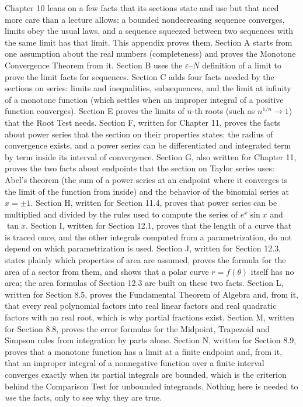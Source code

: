 \documentclass[11pt]{article}
\begin{document}
\begin{guide}
Chapter 10 leans on a few facts that its sections state and use but that need more care than a lecture allows: a bounded nondecreasing sequence converges, limits obey the usual laws, and a sequence squeezed between two sequences with the same limit has that limit. This appendix proves them. Section A starts from one assumption about the real numbers (completeness) and proves the Monotone Convergence Theorem from it. Section B uses the $\varepsilon$--$N$ definition of a limit to prove the limit facts for sequences. Section C adds four facts needed by the sections on series: limits and inequalities, subsequences, and the limit at infinity of a monotone function (which settles when an improper integral of a positive function converges). Section E proves the limits of $n$-th roots (such as $n^{1/n}\to1$) that the Root Test needs. Section F, written for Chapter 11, proves the facts about power series that the section on their properties states: the radius of convergence exists, and a power series can be differentiated and integrated term by term inside its interval of convergence. Section G, also written for Chapter 11, proves the two facts about endpoints that the section on Taylor series uses: Abel's theorem (the sum of a power series at an endpoint where it converges is the limit of the function from inside) and the behavior of the binomial series at $x=\pm1$. Section H, written for Section 11.4, proves that power series can be multiplied and divided by the rules used to compute the series of $e^x\sin x$ and $\tan x$. Section I, written for Section 12.1, proves that the length of a curve that is traced once, and the other integrals computed from a parametrization, do not depend on which parametrization is used. Section J, written for Section 12.3, states plainly which properties of area are assumed, proves the formula for the area of a sector from them, and shows that a polar curve $r=f(\theta)$ itself has no area; the area formulas of Section 12.3 are built on these two facts. Section L, written for Section 8.5, proves the Fundamental Theorem of Algebra and, from it, that every real polynomial factors into real linear factors and real quadratic factors with no real root, which is why partial fractions exist. Section M, written for Section 8.8, proves the error formulas for the Midpoint, Trapezoid and Simpson rules from integration by parts alone. Section N, written for Section 8.9, proves that a monotone function has a limit at a finite endpoint and, from it, that an improper integral of a nonnegative function over a finite interval converges exactly when its partial integrals are bounded, which is the criterion behind the Comparison Test for unbounded integrands. Nothing here is needed to \emph{use} the facts, only to see why they are true.
\end{guide}
\end{document}
